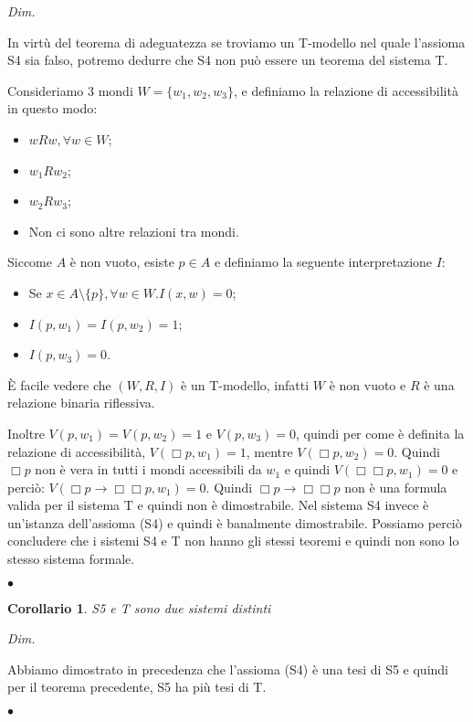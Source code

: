 \documentclass[a4paper, titlepage, 12pt]{report}
\newtheorem{corollario}{Corollario}[chapter]
\newenvironment{proof}
    {\textit{Dim.}
    }
    {\begin{flushright}$\bullet$\end{flushright}
    }
\begin{document}
\begin{proof}
In virtù del teorema di adeguatezza se troviamo un T-modello nel quale l'assioma S4
sia falso, potremo dedurre che S4 non può essere un teorema del sistema T.

Consideriamo 3 mondi $W = \{w_1, w_2, w_3\}$, e definiamo la relazione di accessibilità
in questo modo:
\begin{itemize}
    \item $wRw, \forall w \in W$;
    \item $w_1Rw_2$;
    \item $w_2Rw_3$;
    \item Non ci sono altre relazioni tra mondi.
\end{itemize}

Siccome $A$ è non vuoto, esiste $p \in A$ e definiamo la seguente interpretazione $I:$
\begin{itemize}
    \item Se $x \in A \setminus \{p\}, \forall w \in W. I(x, w) = 0$;
    \item $I(p, w_1) = I(p, w_2) = 1$;
    \item $I(p, w_3) = 0$.
\end{itemize}

È facile vedere che $(W, R, I)$ è un T-modello, infatti $W$ è non vuoto e $R$ è una relazione binaria riflessiva.

Inoltre $V(p, w_1) = V(p, w_2) = 1$ e $V(p, w_3) = 0$, quindi per come è definita
la relazione di accessibilità, $V(\Box p, w_1) = 1$, mentre
$V(\Box p, w_2) = 0$. Quindi $\Box p$ non è vera in tutti i mondi accessibili da $w_1$
e quindi $V(\Box \Box p, w_1) = 0$ e perciò: $V(\Box p \rightarrow \Box\Box p, w_1) = 0$.
Quindi $\Box p \rightarrow \Box\Box p$ non è una formula valida per il sistema T e quindi
non è dimostrabile.
Nel sistema S4 invece è un'istanza dell'assioma (S4) e quindi è banalmente dimostrabile.
Possiamo perciò concludere che i sistemi S4 e T non hanno gli stessi teoremi e quindi non
sono lo stesso sistema formale.
\end{proof}

\begin{corollario}
S5 e T sono due sistemi distinti
\end{corollario}

\begin{proof}
Abbiamo dimostrato in precedenza che l'assioma (S4) è una tesi di S5 e quindi
per il teorema precedente, S5 ha più tesi di T.
\end{proof}
\end{document}

